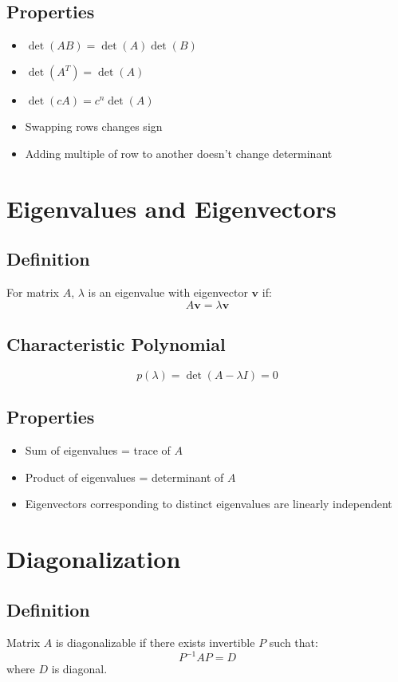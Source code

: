 \documentclass[11pt]{article}
\begin{document}
\subsection{Properties}
\begin{itemize}
    \item $\det(AB) = \det(A)\det(B)$
    \item $\det(A^T) = \det(A)$
    \item $\det(cA) = c^n\det(A)$
    \item Swapping rows changes sign
    \item Adding multiple of row to another doesn't change determinant
\end{itemize}

\section{Eigenvalues and Eigenvectors}

\subsection{Definition}
For matrix $A$, $\lambda$ is an eigenvalue with eigenvector $\mathbf{v}$ if:
$$A\mathbf{v} = \lambda\mathbf{v}$$

\subsection{Characteristic Polynomial}
$$p(\lambda) = \det(A - \lambda I) = 0$$

\subsection{Properties}
\begin{itemize}
    \item Sum of eigenvalues = trace of $A$
    \item Product of eigenvalues = determinant of $A$
    \item Eigenvectors corresponding to distinct eigenvalues are linearly independent
\end{itemize}

\section{Diagonalization}

\subsection{Definition}
Matrix $A$ is diagonalizable if there exists invertible $P$ such that:
$$P^{-1}AP = D$$
where $D$ is diagonal.
\end{document}
